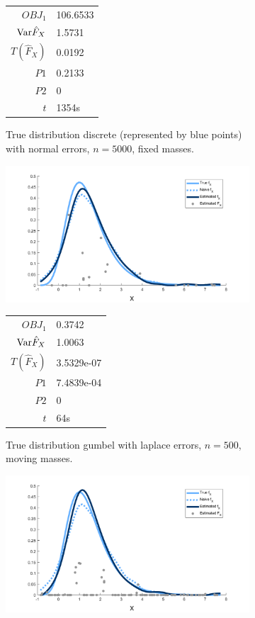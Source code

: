 \begin{figure}
\begin{subfigure}[b]{0.38\textwidth}
\begin{tabular}{r l}
			$OBJ_1$ & 106.6533\\
			$\mathrm{Var} \hat{F}_X$ & 1.5731\\
			$T(\hat{F}_X)$ & 0.0192\\
			$P1$ & 0.2133\\
			$P2$ & 0\\
			$t$ & 1354s
		\end{tabular}
		\caption{True distribution discrete (represented by blue points) with normal errors, $n = 5000$, fixed masses.}
		\label{fig:fixed masses discrete}
	\end{subfigure}
	\begin{subfigure}[b]{0.38\textwidth}
		\centering
		\includegraphics[width = \textwidth]{Figures/Deconvolution/moving_masses_gumbel_lap_example.png}
		\begin{tabular}{r l}
			$OBJ_1$ & 0.3742\\
			$\mathrm{Var} \hat{F}_X$ & 1.0063\\
			$T(\hat{F}_X)$ & 3.5329e-07\\
			$P1$ & 7.4839e-04\\
			$P2$ & 0\\
			$t$ & 64s
		\end{tabular}
		\caption{True distribution gumbel with laplace errors, $n = 500$, moving masses.}
		\label{fig:moving masses gumbel lap}
	\end{subfigure}
	\hfill
	\begin{subfigure}[b]{0.38\textwidth}
		\centering
		\includegraphics[width = \textwidth]{Figures/Deconvolution/fixed_masses_gumbel_lap_example.png}

\end{subfigure}
\end{figure}
